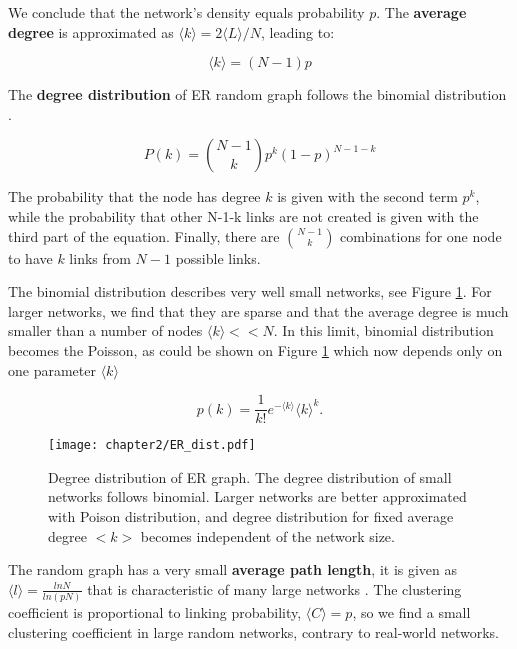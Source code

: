 We conclude that the network's density equals probability $p$.
The \textbf{average degree} is approximated as $\langle k \rangle = 2 \langle L \rangle / N $, leading to:

\begin{equation}
\langle k \rangle = (N-1)p 
\end{equation}

The \textbf{degree distribution} of ER random graph follows the binomial distribution \cite{barabasi2016network}. 

\begin{equation}
P(k) = \binom{N-1}{k}p^k(1-p)^{N-1-k}
\end{equation}

The probability that the node has degree $k$ is given with the second term $p^k$, while the probability that other N-1-k links are not created is given with the third part of the equation. Finally, there are  $\binom{N-1}{k}$ combinations for one node to have $k$ links from $N-1$ possible links. 

The binomial distribution describes very well small networks, see Figure \ref{fig:erdist}. For larger networks, we find that they are sparse and that the average degree is much smaller than a number of nodes $\langle k \rangle << N$. In this limit, binomial distribution becomes the Poisson, as could be shown on Figure \ref{fig:erdist} which now depends only on one parameter $\langle k \rangle$


\begin{equation}
p(k) = \frac{1}{k!}e^{-\langle k \rangle}\langle k \rangle^{k}.
\end{equation}

\begin{figure}[H]
	\centering
	\texttt{[image: chapter2/ER\_dist.pdf]}
	\caption[Degree distribution of Erdős-R\' {e}nyi graph.]{Degree distribution of ER graph. The degree distribution of small networks follows binomial. Larger networks are better approximated with Poison distribution, and degree distribution for fixed average degree $<k>$ becomes independent of the network size.}
	\label{fig:erdist}
\end{figure}

The random graph has a very small \textbf{average path length}, it is given as $\langle l \rangle = \frac{ln N}{ln(pN)}$ that is characteristic of many large networks \cite{bollobas2003mathematical}. The clustering coefficient is proportional to linking probability, $\langle C \rangle = p$, so we find a small clustering coefficient in large random networks, contrary to real-world networks.  %

